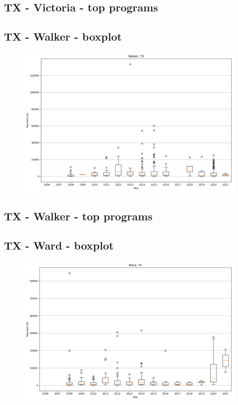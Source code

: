 \subsection*{TX - Victoria - top programs}

\newpage
\subsection*{TX - Walker - boxplot}
\begin{figure}[h]
\centering
\includegraphics[width=7in]{../output/boxplots/counties/Walker-TX_boxplot.png}
\end{figure}


\subsection*{TX - Walker - top programs}

\newpage
\subsection*{TX - Ward - boxplot}
\begin{figure}[h]
\centering
\includegraphics[width=7in]{../output/boxplots/counties/Ward-TX_boxplot.png}
\end{figure}


